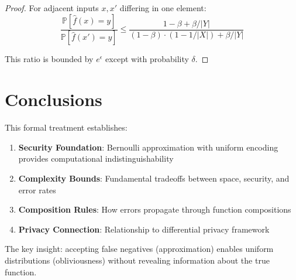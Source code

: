 \documentclass[11pt]{article}
\newcommand{\Obv}[1]{\widehat{#1}}
\newcommand{\Prob}[1]{\mathbb{P}[#1]}
\begin{document}
\begin{proof}
For adjacent inputs $x, x'$ differing in one element:
\[
\frac{\Prob{\Obv{f}(x) = y}}{\Prob{\Obv{f}(x') = y}} \leq \frac{1-\beta+\beta/|Y|}{(1-\beta)\cdot(1-1/|X|)+\beta/|Y|}
\]

This ratio is bounded by $e^\epsilon$ except with probability $\delta$.
\end{proof}

\section{Conclusions}

This formal treatment establishes:
\begin{enumerate}
    \item \textbf{Security Foundation}: Bernoulli approximation with uniform encoding provides computational indistinguishability
    \item \textbf{Complexity Bounds}: Fundamental tradeoffs between space, security, and error rates
    \item \textbf{Composition Rules}: How errors propagate through function compositions
    \item \textbf{Privacy Connection}: Relationship to differential privacy framework
\end{enumerate}

The key insight: accepting false negatives (approximation) enables uniform distributions (obliviousness) without revealing information about the true function.
\end{document}
